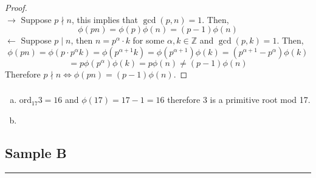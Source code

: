 \documentclass[class=article, crop=false]{standalone}
\def\integers{{\mathbb Z}}
\def\ord{{\text{ord}}}
\begin{document}
\subsubsection{}
\begin{proof}
	$ $\\
	$\rightarrow$ Suppose $p\nmid n$, this implies that $\gcd(p, n) =1$. Then, 
	$$\phi(pn) = \phi(p)\phi(n) = (p-1)\phi(n)$$
	$\leftarrow$ Suppose $p\mid n$, then $n = p^{\alpha} \cdot k$ for some $\alpha, k\in\integers$ and
	$\gcd(p, k) =1$. Then,
	$$\phi(pn) = \phi(p \cdot p^{\alpha}k) = \phi(p^{\alpha +1} k) = \phi(p^{\alpha +1}) \phi(k) = (p^{\alpha + 1} - p^{\alpha}) \phi(k)$$
	$$ = p\phi(p^{\alpha})\phi(k) = p\phi(n) \neq (p-1)\phi(n)$$
	Therefore $p\nmid n \iff \phi(pn) = (p-1)\phi(n)$.
\end{proof}
\subsubsection{}
\begin{enumerate}[(a)]
	\item $\ord_{17}3= 16$ and $\phi(17)=17-1=16$ therefore $3$ is a primitive root mod 17.
	\item 
\end{enumerate}
\subsubsection{}
\subsubsection{}
\subsubsection{}

\setcounter{subsection}{1}
\subsection{Sample B}
\rule{\textwidth}{1pt}\\
\subsubsection{}
\subsubsection{}
\subsubsection{}
\end{document}
